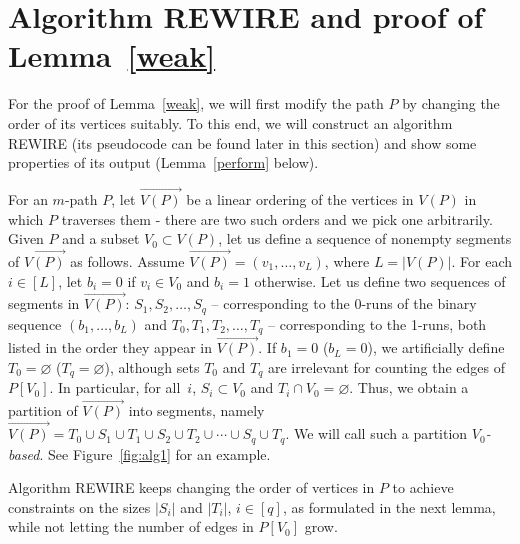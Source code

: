 \documentclass[reqno, 12pt]{amsart}
\numberwithin{equation}{section}
\numberwithin{figure}{section}
\let\emptyset=\varnothing
\theoremstyle{plain}
\theoremstyle{definition}
\begin{document}
\section{Algorithm REWIRE and proof of Lemma~\ref{weak}}

For the proof of Lemma~\ref{weak}, we will first modify the path $P$ by changing the order of its vertices suitably. To this end, we will construct an algorithm REWIRE (its pseudocode can be found later in this section) and show some properties of its output (Lemma~\ref{perform} below).

For an $m$-path $P$, let $\overrightarrow{V(P)}$ be a linear ordering of the vertices in $V(P)$ in which $P$ traverses them - there are two such orders and we pick one arbitrarily.
Given $P$ and a subset $V_0\subset V(P)$, let us define a sequence of nonempty segments of $\overrightarrow{V(P)}$ as follows. Assume $\overrightarrow{V(P)}=(v_1,\dots,v_L)$, where $L=|V(P)|$. For each $i\in[L]$, let $b_i=0$ if $v_i\in V_0$ and $b_i=1$ otherwise. Let us define two sequences of segments  in $\overrightarrow{V(P)}$:
$S_1, S_2,\dots,S_q$ -- corresponding to the 0-runs of the binary sequence $(b_1,\dots,b_L)$ and $T_0, T_1, T_2,\dots, T_q$ -- corresponding to the 1-runs, both listed in the order they appear in $\overrightarrow{V(P)}$. If $b_1=0$ ($b_L=0$), we artificially define $T_0=\emptyset$ ($T_q=\emptyset$), although sets $T_0$ and $T_q$ are irrelevant for counting the edges of $P[V_0]$. In particular, for all~$i$, $S_i \subset V_{0}$ and  $T_i \cap V_{0} = \emptyset$. Thus, we obtain a partition of $\overrightarrow{V(P)}$ into segments, namely $\overrightarrow{V(P)} = T_0\cup S_1\cup T_1\cup S_2\cup T_2 \cup \cdots\cup S_q\cup T_q$. We will call such a partition \emph{$V_0$-based}.  See Figure~\ref{fig:alg1} for an example.

Algorithm REWIRE keeps changing the order of vertices in $P$ to achieve constraints on the sizes $|S_i|$  and $|T_i|$, $i\in[q]$, as formulated in the next lemma, while not letting the number of edges in $P[V_0]$ grow.
\end{document}
